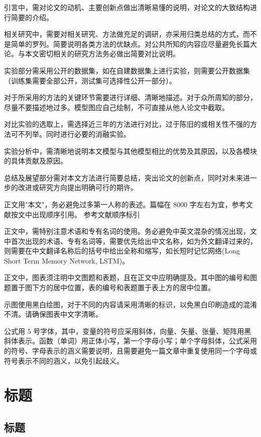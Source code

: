 \documentclass[10pt,twoside,twocolumn]{article}
\begin{document}
引言中，需对论文的动机、主要创新点做出清晰易懂的说明，对论文的大致结构进行简要的介绍。

相关研究中，需要对相关研究、方法做充足的调研，亦采用归类总结的方式，而不是简单的罗列。简要说明各类方法的优缺点。对公共所知的内容应尽量避免长篇大论。与本文密切相关的研究方法务必做出简要对比说明。

实验部分需采用公开的数据集，如在自建数据集上进行实验，则需要公开数据集（训练集需要全部公开，测试集可选择性公开一部分）。

对于所采用的方法的关键环节需要进行详细、清晰地描述。对于众所周知的部分，尽量不要描述地过多。模型图应自己绘制，不可直接从他人论文中截取。

对比实验的选取上，需选择近三年的方法进行对比，过于陈旧的或相关性不强的方法可不列举。同时进行必要的消融实验。

实验分析中，需清晰地说明本文模型与其他模型相比的优势及其原因，以及各模块的具体贡献及原因。

总结及展望部分需对本文方法进行简要总结，突出论文的创新点，同时对未来进一步的改进或研究方向提出明确可行的期许。

正文用"本文"，务必避免过多第一人称的表述。篇幅在 8000 字左右为宜，参考文献按文中出现顺序引用。\cite{ref1} 参考文献顺序标引

正文中，需特别注意术语和专有名词的使用。务必避免中英文混杂的情况出现，文中首次出现的术语、专有名词等，需要优先给出中文名称，如为外文翻译过来的，则需要在中文翻译名称后的括号中给出全称和缩写，如长短时记忆网络(Long Short Term Memory Network, LSTM)。

正文中，图表须注明中文图题和表题，且在正文中应明确提及。其中图的编号和图题置于图下方的居中位置，表的编号和表题置于表上方的居中位置。

示图使用黑白绘图，对于不同的内容请采用清晰的标识，以免黑白印刷造成的混淆不清。请确保图表中文字清晰。

公式用 5 号字体，其中，变量的符号应采用斜体，向量、矢量、张量、矩阵用黑斜体表示。函数（单词）用正体小写，第一个字母小写；单个字母斜体，公式采用的符号、字母表示的涵义需要说明，且需要避免一篇文章中重复使用同一个字母或符号表示不同的涵义，以免引起歧义。

\section{标题}

\subsection{标题}
\end{document}
